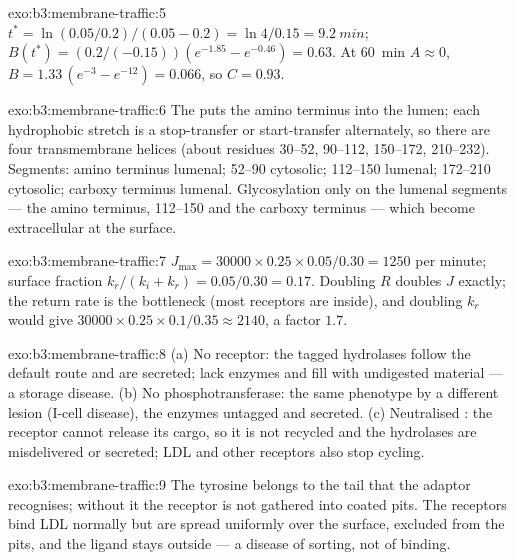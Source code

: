 \begin{solution}{exo:b3:membrane-traffic:5}
$t^{*} = \ln(0.05/0.2)/(0.05 - 0.2) = \ln 4/0.15 = \qty{9.2}{min}$;
$B(t^{*}) = (0.2/(-0.15))(e^{-1.85} - e^{-0.46}) = 0.63$. At \qty{60}{min}
$A \approx 0$, $B = 1.33\,(e^{-3} - e^{-12}) = 0.066$, so $C = 0.93$.
\end{solution}

\begin{solution}{exo:b3:membrane-traffic:6}
The  puts the amino terminus into the lumen; each
hydrophobic stretch is a stop-transfer or start-transfer alternately,
so there are four transmembrane helices (about residues 30--52,
90--112, 150--172, 210--232). Segments: amino terminus lumenal;
52--90 cytosolic; 112--150 lumenal; 172--210 cytosolic; carboxy
terminus lumenal. Glycosylation only on the lumenal segments --- the
amino terminus, 112--150 and the carboxy terminus --- which become
extracellular at the surface.
\end{solution}

\begin{solution}{exo:b3:membrane-traffic:7}
$J_{\max} = \num{30000}\times 0.25\times 0.05/0.30 = 1250$ per minute;
surface fraction $k_{r}/(k_{i} + k_{r}) = 0.05/0.30 = 0.17$. Doubling $R$
doubles $J$ exactly; the return rate is the bottleneck (most receptors
are inside), and doubling $k_{r}$ would give $\num{30000}\times 0.25
\times 0.1/0.35 \approx 2140$, a factor $1.7$.
\end{solution}

\begin{solution}{exo:b3:membrane-traffic:8}
(a) No receptor: the tagged hydrolases follow the default route and
are secreted;  lack enzymes and fill with undigested
material --- a storage disease. (b) No phosphotransferase: the same
phenotype by a different lesion (I-cell disease), the enzymes
untagged and secreted. (c) Neutralised : the receptor cannot
release its cargo, so it is not recycled and the hydrolases are
misdelivered or secreted; LDL and other receptors also stop cycling.
\end{solution}

\begin{solution}{exo:b3:membrane-traffic:9}
The tyrosine belongs to the tail  that the  adaptor
recognises; without it the receptor is not gathered into coated pits.
The receptors bind LDL normally but are spread uniformly over the
surface, excluded from the pits, and the ligand stays outside --- a
disease of sorting, not of binding.
\end{solution}

